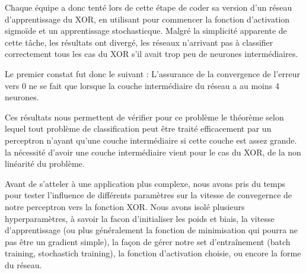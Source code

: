 \documentclass[
    10pt,
    a4paper,
    oneside,
    headinclude,footinclude,
    BCOR=5mm,
    captions=tableabove
]{scrartcl}
\begin{document}
 Chaque équipe a donc tenté lors de cette étape de coder sa version d'un réseau d'apprentissage du XOR, en utilisant pour commencer la fonction d'activation sigmoïde et un apprentissage stochasticque. Malgré la simplicité apparente de cette tâche, les résultats ont divergé, les réseaux n'arrivant pas à classifier correctement tous les cas du XOR s'il avait trop peu de neurones intermédiaires.

Le premier constat fut donc le suivant : L'assurance de la convergence de l'erreur vers $0$ ne se fait que lorsque la couche intermédiaire du réseau a au moins 4 neurones.

Ces résultats nous permettent de vérifier pour ce problème le théorème selon lequel tout problème de classification peut être traité efficacement par un perceptron n'ayant qu'une couche intermédiaire si cette couche est assez grande. la nécessité d'avoir une couche intermédiaire vient pour le cas du XOR, de la non linéarité du problème.

Avant de s'atteler à une application plus complexe, nous avons pris du temps pour tester l'influence de différents paramètres sur la vitesse de convegernce de notre perceptron vers la fonction XOR. 
Nous avons isolé plusieurs hyperparamètres, à savoir  la facon d'initialiser les poids et biais, la vitesse d'apprentissage (ou plus généralement la fonction de minimisation qui pourra ne pas être un gradient simple), la façon de gérer notre set d'entraînement (batch training, stochastich training), la fonction d'activation choisie, ou encore la forme du réseau.
\end{document}
